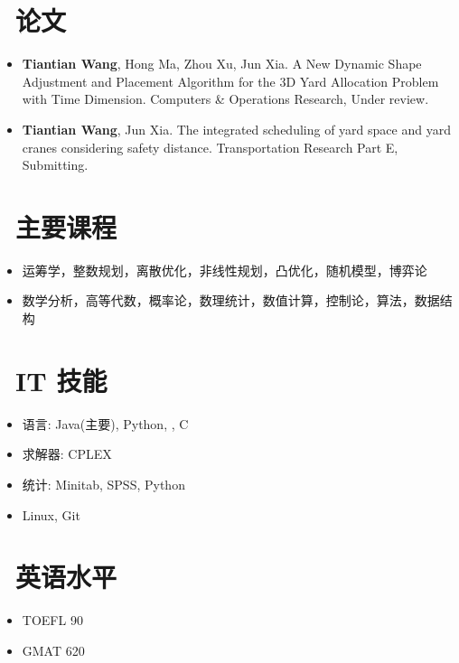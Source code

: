 \documentclass[11pt]{article}
\begin{document}
\section{\makebox[\widthof{\faGraduationCap}][c]{\color{CVBlue}\faBookmarkO}\ 论文}
\begin{itemize}[parsep=0.5ex]
	\item \textbf{Tiantian Wang}, Hong Ma, Zhou Xu, Jun Xia. A New Dynamic Shape Adjustment and Placement Algorithm for the 3D Yard Allocation Problem with Time Dimension. Computers \& Operations Research, Under review.
	\item \textbf{Tiantian Wang}, Jun Xia. The integrated scheduling of yard space and yard cranes considering safety distance. Transportation Research Part E, Submitting.
\end{itemize}

\section{\makebox[\widthof{\faGraduationCap}][c]{\color{CVBlue}\faBook}\ 主要课程}
\begin{itemize}[parsep=0.5ex]
  \item 运筹学，整数规划，离散优化，非线性规划，凸优化，随机模型，博弈论
  \item 数学分析，高等代数，概率论，数理统计，数值计算，控制论，算法，数据结构
\end{itemize}

\section{\makebox[\widthof{\faGraduationCap}][c]{\color{CVBlue}\faCogs}\ IT 技能}
\begin{itemize}[parsep=0.5ex]
  \item 语言: Java(主要), Python, \Cpp, C
  \item 求解器: CPLEX
  \item 统计: Minitab, SPSS, Python
  \item Linux, Git
\end{itemize}


\section{\makebox[\widthof{\faGraduationCap}][c]{\color{CVBlue}\faLanguage}\ 英语水平}
\begin{itemize}[parsep=0.5ex]
  \item TOEFL 90
  \item GMAT 620
\end{itemize}
\end{document}
